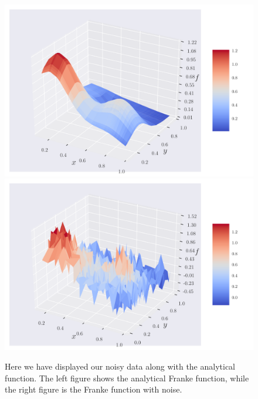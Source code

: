 \documentclass[reprint,english,notitlepage,aps,nobalancelastpage,nofootinbib]{revtex4-1}  %
\begin{document}
\begin{figure}[h]
	\includegraphics[width=\linewidth]{Frank_anal_eps_0.pdf}
	\endminipage\hfill
	\includegraphics[width=\linewidth]{Franke_rawdata_eps02.pdf}
	\endminipage
	\caption{Here we have displayed our noisy data along with the analytical function. The left figure shows the analytical Franke function, while the right figure is the Franke function with noise.}\label{fig:FF_dataset}
\end{figure}
\end{document}
